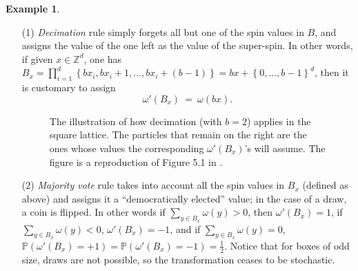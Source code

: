 \documentclass[12pt]{article}
\renewcommand{\P}{\mathbb{P}}
\newcommand{\Z}{\mathbb{Z}}
\newcommand{\set}[1]{\left\{#1\right\}}
\newcommand{\1}{\mathbbm{1}}
\newcommand{\5}{\vspace{0.5cm}}
\theoremstyle{definition}
\newtheorem{ex}[thm]{Example}
\begin{document}
\begin{ex}\label{RG:example}
~
\begin{itemize}
	\item[(1)] \textit{Decimation} rule simply forgets all but one of the spin values in $B$, and assigns the value of the one left as the value of the super-spin. In other words, if given $x\in\Z^d$, one has $B_x=\prod_{i=1}^d \set{b x_i,b x_i+1,\ldots,b x_i+(b-1)}=bx+\set{0,\ldots,b-1}^d$, then it is customary to assign
	$$\omega'(B_x) ~=~ \omega(bx).$$
\vspace{-0.9cm}
\begin{figure}[h!]
\centering
{}
\caption{The illustration of how decimation (with $b=2$) applies in the square lattice. The particles that remain on the right are the ones whose values the corresponding $\omega'(B_x)$'s will assume. The figure is a reproduction of Figure 5.1 in \cite{Ber}.}
\end{figure}
\vspace{-0.5cm}
	\item[(2)] \textit{Majority vote} rule takes into account all the spin values in $B_x$ (defined as above) and assigns it a ``democratically elected'' value; in the case of a draw, a coin is flipped. In other words if $\sum_{y\in B_x}\omega(y)>0$, then $\omega'(B_x)=1$, if $\sum_{y\in B_x}\omega(y)<0$, $\omega'(B_x)=-1$, and if $\sum_{y\in B_x}\omega(y)=0$, $\P(\omega'(B_x)=+1)=\P(\omega'(B_x)=-1)=\frac{1}{2}$. Notice that for boxes of odd size, draws are not possible, so the transformation ceases to be stochastic.

\end{itemize}
\end{ex}
\end{document}
